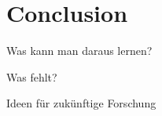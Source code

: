 \chapter{Conclusion}
\label{ch:conclusion}

Was kann man daraus lernen?

Was fehlt?

Ideen für zukünftige Forschung
